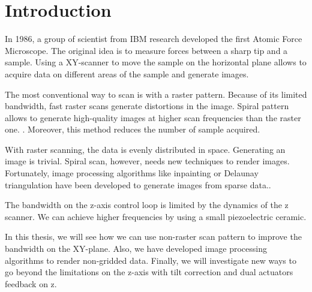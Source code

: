 \chapter{Introduction}

In 1986, a group of scientist from IBM research developed the first Atomic Force Microscope.\cite{binnig1986atomic} The original idea is to measure forces between a sharp tip and a sample. Using a XY-scanner to move the sample on the horizontal plane allows to acquire data on different areas of the sample and generate images. 

The most conventional way to scan is with a raster pattern. Because of its limited bandwidth, fast raster scans generate distortions in the image.\cite{yong2010high} Spiral pattern allows to generate high-quality images at higher scan frequencies than the raster one. \cite{mahmood2009fast}. Moreover, this method reduces the number of sample acquired. \cite{nonrasterdata}

With raster scanning, the data is evenly distributed in space. Generating an image is trivial. Spiral scan, however, needs new techniques to render images. Fortunately, image processing algorithms like inpainting \cite{richard2001fast} or Delaunay triangulation have been developed to generate images from sparse data.\cite{nonrasterdata}.

The bandwidth on the z-axis control loop is limited by the dynamics of the z scanner.\cite{jeong:093706} We can achieve higher frequencies by using a small piezoelectric ceramic.\cite{sulchek1999dual}


In this thesis, we will see how we can use non-raster scan pattern to improve the bandwidth on the XY-plane. Also, we have developed image processing algorithms to render non-gridded data. Finally, we will investigate new ways to go beyond the limitations on the z-axis with tilt correction and dual actuators feedback on z.


